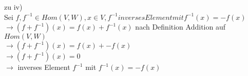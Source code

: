 \noindent zu iv)\\
Sei $f,f^{-1} \in Hom(V,W), x \in V, f^{-1} inverses Element mit f^{-1}(x) = -f(x)$\\
$\rightarrow (f + f^{-1})(x) = f(x) + f^{-1}(x)$ nach Definition Addition auf $Hom(V,W)$\\
$\rightarrow (f + f^{-1})(x) = f(x) + -f(x)$\\
$\rightarrow (f + f^{-1})(x) = 0$\\
$\rightarrow$ inverses Element $f^{-1}$ mit $f^{-1}(x) = -f(x)$\\\\
